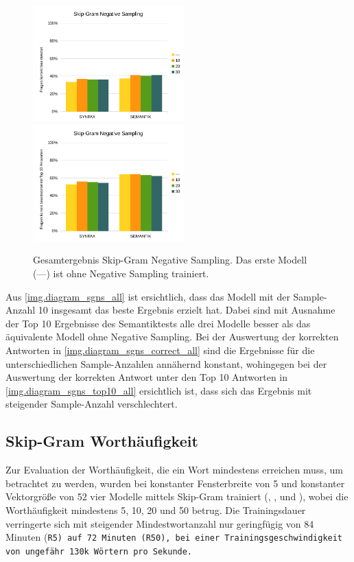 \begin{figure}[H]
\begin{adjustwidth}{-4mm}{-4mm}
\centering
{}
{\includegraphics[width=0.52\textwidth]{images/diagram_sgns_correct_all}}
{\includegraphics[width=0.52\textwidth]{images/diagram_sgns_top10_all}}
\caption[Gesamtergebnis Skip-Gram Negative Sampling]{Gesamtergebnis Skip-Gram Negative Sampling. Das erste Modell (---) ist ohne Negative Sampling trainiert.}\label{img.diagram_sgns_all}
\end{adjustwidth}
\end{figure}

Aus \autoref{img.diagram_sgns_all} ist ersichtlich, dass das Modell  mit der Sample-Anzahl 10 insgesamt das beste Ergebnis erzielt hat. Dabei sind mit Ausnahme der Top 10 Ergebnisse des Semantiktests alle drei Modelle besser als das äquivalente Modell ohne Negative Sampling. Bei der Auswertung der korrekten Antworten in \autoref{img.diagram_sgns_correct_all} sind die Ergebnisse für die unterschiedlichen Sample-Anzahlen annähernd konstant, wohingegen bei der Auswertung der korrekten Antwort unter den Top 10 Antworten in \autoref{img.diagram_sgns_top10_all} ersichtlich ist, dass sich das Ergebnis mit steigender Sample-Anzahl verschlechtert.

\subsection{Skip-Gram Worthäufigkeit}
Zur Evaluation der Worthäufigkeit, die ein Wort mindestens erreichen muss, um betrachtet zu werden, wurden bei konstanter Fensterbreite von 5 und konstanter Vektorgröße von 52 vier Modelle mittels Skip-Gram trainiert (, ,  und ), wobei die Worthäufigkeit mindestens 5, 10, 20 und 50 betrug. Die Trainingsdauer verringerte sich mit steigender Mindestwortanzahl nur geringfügig von 84 Minuten (\tt{R5}) auf 72 Minuten (\tt{R50}), bei einer Trainingsgeschwindigkeit von ungefähr 130k Wörtern pro Sekunde.


